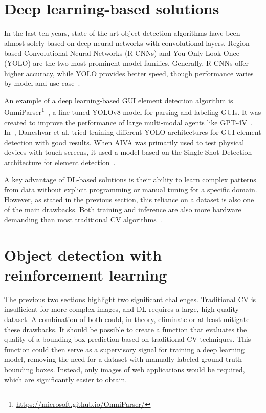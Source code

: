 \documentclass[
  digital,     %
  oneside,     %
  nosansbold,  %
  nocolorbold, %
  lof,         %
  lot,         %
]{fithesis4}
\begin{document}
\section{Deep learning-based solutions}
In the last ten years, state-of-the-art object detection algorithms have been almost solely based on deep neural networks with convolutional layers. Region-based Convolutional Neural Networks (R-CNNs) and You Only Look Once (YOLO) are the two most prominent model families. Generally, R-CNNs offer higher accuracy, while YOLO provides better speed, though performance varies by model and use case~\cite{ObjectDetectionHistorySurvey}.

An example of a deep learning-based GUI element detection algorithm is OmniParser\footnote{\url{https://microsoft.github.io/OmniParser/}}~, a fine-tuned YOLOv8 model for parsing and labeling GUIs. It was created to improve the performance of large multi-modal agents like GPT-4V~\cite{OmniParser}. In~\cite{GUI_YOLO_comparison}, Daneshvar et al. tried training different YOLO architectures for GUI element detection with good results. When AIVA was primarily used to test physical devices with touch screens, it used a model based on the Single Shot Detection architecture for element detection~\cite{Horak2020thesis}.

A key advantage of DL-based solutions is their ability to learn complex patterns from data without explicit programming or manual tuning for a specific domain. However, as stated in the previous section, this reliance on a dataset is also one of the main drawbacks. Both training and inference are also more hardware demanding than most traditional CV algorithms~\cite{DLvsTCV}.

\section{Object detection with reinforcement learning}

The previous two sections highlight two significant challenges. Traditional CV is insufficient for more complex images, and DL requires a large, high-quality dataset. A combination of both could, in theory, eliminate or at least mitigate these drawbacks. It should be possible to create a function that evaluates the quality of a bounding box prediction based on traditional CV techniques. This function could then serve as a supervisory signal for training a deep learning model, removing the need for a dataset with manually labeled ground truth bounding boxes. Instead, only images of web applications would be required, which are significantly easier to obtain.
\end{document}
